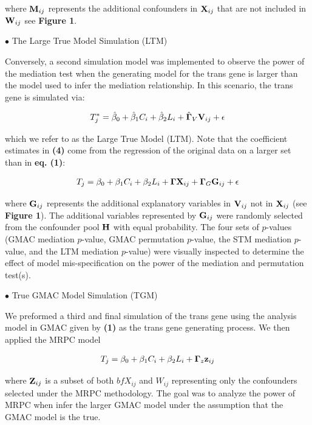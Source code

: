 \documentclass[
]{article}
\begin{document}
where \({\bf M}_{ij}\) represents the additional confounders in
\({\bf X}_{ij}\) that are not included in \({\bf W}_{ij}\) see
\textbf{Figure 1}.

\indent \(\bullet\) The Large True Model Simulation (LTM)

Conversely, a second simulation model was implemented to observe the
power of the mediation test when the generating model for the trans gene
is larger than the model used to infer the mediation relationship. In
this scenario, the trans gene is simulated via:

\begin{eqnarray} T^{\ast}_{j} = \hat{\beta}_0+\hat{\beta}_1C_i + \hat{\beta}_2L_i + \hat{{\bf \Gamma}}_V{\bf V}_{ij} +\epsilon  \end{eqnarray}

which we refer to as the Large True Model (LTM). Note that the
coefficient estimates in \textbf{(4)} come from the regression of the
original data on a larger set than in \textbf{eq. (1)}:

\begin{eqnarray} T_{j} = \beta_0+\beta_1C_i + \beta_2L_i + {\bf\Gamma} {\bf X}_{ij} + {\bf \Gamma}_{G}{\bf G}_{ij} +\epsilon \end{eqnarray}

where \({\bf G}_{ij}\) represents the additional explanatory variables
in \({\bf V}_{ij}\) not in \({\bf X}_{ij}\) (see \textbf{Figure 1}). The
additional variables represented by \({\bf G}_{ij}\) were randomly
selected from the confounder pool \({\bf H}\) with equal probability.
The four sets of \(p\)-values (GMAC mediation \(p\)-value, GMAC
permutation \(p\)-value, the STM mediation \(p\)-value, and the LTM
mediation \(p\)-value) were visually inspected to determine the effect
of model mis-specification on the power of the mediation and permutation
test(s).

\indent \(\bullet\) True GMAC Model Simulation (TGM)

We preformed a third and final simulation of the trans gene using the
analysis model in GMAC given by \textbf{(1)} as the trans gene
generating process. We then applied the MRPC model

\begin{eqnarray}  T_j = \beta_0 + \beta_1 C_i +\beta_2 L_i + {\bf \Gamma}_z {\bf z}_{ij} \end{eqnarray}

where \({\bf Z}_{ij}\) is a subset of both \({bf X}_{ij}\) and
\({W}_{ij}\) representing only the confounders selected under the MRPC
methodology. The goal was to analyze the power of MRPC when infer the
larger GMAC model under the assumption that the GMAC model is the true.
\end{document}
